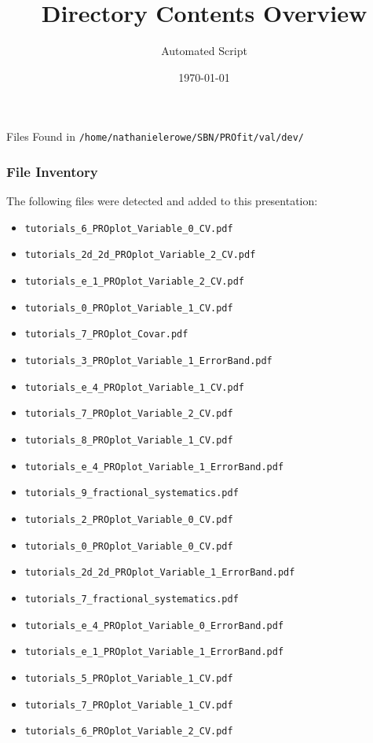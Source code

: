 \documentclass{beamer}
\title{Directory Contents Overview}
\author{Automated Script}
\date{\today}
\begin{document}
\begin{frame}
  \titlepage
\end{frame}

\begin{frame}{Files Found in \texttt{/home/nathanielerowe/SBN/PROfit/val/dev/}}
  \frametitle{File Inventory}
  The following files were detected and added to this presentation:
  \begin{itemize}
    \item \texttt{tutorials\_6\_PROplot\_Variable\_0\_CV.pdf}
    \item \texttt{tutorials\_2d\_2d\_PROplot\_Variable\_2\_CV.pdf}
    \item \texttt{tutorials\_e\_1\_PROplot\_Variable\_2\_CV.pdf}
    \item \texttt{tutorials\_0\_PROplot\_Variable\_1\_CV.pdf}
    \item \texttt{tutorials\_7\_PROplot\_Covar.pdf}
    \item \texttt{tutorials\_3\_PROplot\_Variable\_1\_ErrorBand.pdf}
    \item \texttt{tutorials\_e\_4\_PROplot\_Variable\_1\_CV.pdf}
    \item \texttt{tutorials\_7\_PROplot\_Variable\_2\_CV.pdf}
    \item \texttt{tutorials\_8\_PROplot\_Variable\_1\_CV.pdf}
    \item \texttt{tutorials\_e\_4\_PROplot\_Variable\_1\_ErrorBand.pdf}
    \item \texttt{tutorials\_9\_fractional\_systematics.pdf}
    \item \texttt{tutorials\_2\_PROplot\_Variable\_0\_CV.pdf}
    \item \texttt{tutorials\_0\_PROplot\_Variable\_0\_CV.pdf}
    \item \texttt{tutorials\_2d\_2d\_PROplot\_Variable\_1\_ErrorBand.pdf}
    \item \texttt{tutorials\_7\_fractional\_systematics.pdf}
    \item \texttt{tutorials\_e\_4\_PROplot\_Variable\_0\_ErrorBand.pdf}
    \item \texttt{tutorials\_e\_1\_PROplot\_Variable\_1\_ErrorBand.pdf}
    \item \texttt{tutorials\_5\_PROplot\_Variable\_1\_CV.pdf}
    \item \texttt{tutorials\_7\_PROplot\_Variable\_1\_CV.pdf}
    \item \texttt{tutorials\_6\_PROplot\_Variable\_2\_CV.pdf}

\end{itemize}
\end{frame}
\end{document}

